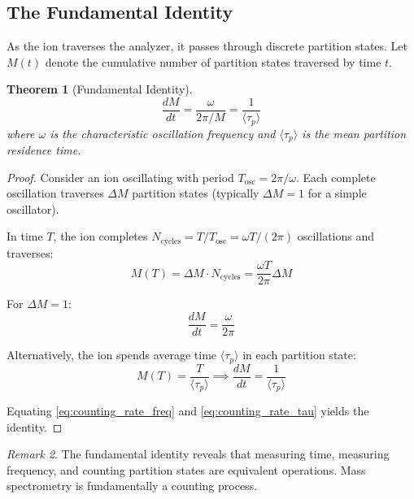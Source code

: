\documentclass[twocolumn,10pt,a4paper]{article}
\newtheorem{theorem}{Theorem}[section]
\theoremstyle{definition}
\theoremstyle{remark}
\newtheorem{remark}[theorem]{Remark}
\newcommand{\taup}{\tau_p}
\begin{document}
\subsection{The Fundamental Identity}

As the ion traverses the analyzer, it passes through discrete partition states. Let $M(t)$ denote the cumulative number of partition states traversed by time $t$.

\begin{theorem}[Fundamental Identity]
\label{thm:fundamental}
\begin{equation}
    \boxed{\frac{dM}{dt} = \frac{\omega}{2\pi/M} = \frac{1}{\langle\taup\rangle}}
    \label{eq:fundamental_identity}
\end{equation}
where $\omega$ is the characteristic oscillation frequency and $\langle\taup\rangle$ is the mean partition residence time.
\end{theorem}

\begin{proof}
Consider an ion oscillating with period $T_{\mathrm{osc}} = 2\pi/\omega$. Each complete oscillation traverses $\Delta M$ partition states (typically $\Delta M = 1$ for a simple oscillator).

In time $T$, the ion completes $N_{\mathrm{cycles}} = T/T_{\mathrm{osc}} = \omega T/(2\pi)$ oscillations and traverses:
\begin{equation}
    M(T) = \Delta M \cdot N_{\mathrm{cycles}} = \frac{\omega T}{2\pi}\Delta M
\end{equation}

For $\Delta M = 1$:
\begin{equation}
    \frac{dM}{dt} = \frac{\omega}{2\pi}
    \label{eq:counting_rate_freq}
\end{equation}

Alternatively, the ion spends average time $\langle\taup\rangle$ in each partition state:
\begin{equation}
    M(T) = \frac{T}{\langle\taup\rangle} \implies \frac{dM}{dt} = \frac{1}{\langle\taup\rangle}
    \label{eq:counting_rate_tau}
\end{equation}

Equating \eqref{eq:counting_rate_freq} and \eqref{eq:counting_rate_tau} yields the identity.
\end{proof}

\begin{remark}
The fundamental identity reveals that measuring time, measuring frequency, and counting partition states are equivalent operations. Mass spectrometry is fundamentally a counting process.
\end{remark}
\end{document}
